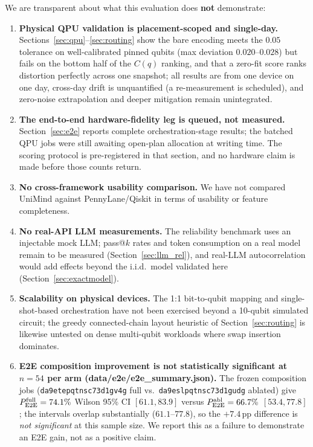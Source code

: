 ﻿\documentclass[12pt,a4paper]{article}
\begin{document}
We are transparent about what this evaluation does \textbf{not} demonstrate:

\begin{enumerate}[leftmargin=2em]
    \item \textbf{Physical QPU validation is placement-scoped and single-day.} Sections~\ref{sec:qpu}--\ref{sec:routing} show the bare encoding meets the $0.05$ tolerance on well-calibrated pinned qubits (max deviation $0.020$--$0.028$) but fails on the bottom half of the $C(q)$ ranking, and that a zero-fit score ranks distortion perfectly across one snapshot; all results are from one device on one day, cross-day drift is unquantified (a re-measurement is scheduled), and zero-noise extrapolation and deeper mitigation remain unintegrated.
    \item \textbf{The end-to-end hardware-fidelity leg is queued, not measured.} Section~\ref{sec:e2e} reports complete orchestration-stage results; the batched QPU jobs were still awaiting open-plan allocation at writing time. The scoring protocol is pre-registered in that section, and no hardware claim is made before those counts return.
    \item \textbf{No cross-framework usability comparison.} We have not compared UniMind against PennyLane/Qiskit in terms of usability or feature completeness.
    \item \textbf{No real-API LLM measurements.} The reliability benchmark uses an injectable mock LLM; pass@$k$ rates and token consumption on a real model remain to be measured (Section~\ref{sec:llm_rel}), and real-LLM autocorrelation would add effects beyond the i.i.d.\ model validated here (Section~\ref{sec:exactmodel}).
    \item \textbf{Scalability on physical devices.} The 1:1 bit-to-qubit mapping and single-shot-based orchestration have not been exercised beyond a 10-qubit simulated circuit; the greedy connected-chain layout heuristic of Section~\ref{sec:routing} is likewise untested on dense multi-qubit workloads where swap insertion dominates.
    \item \textbf{E2E composition improvement is not statistically significant at $n{=}54$ per arm (data/e2e/e2e\_summary.json).} The frozen composition jobs (\texttt{da9etepqtnsc73d1gv4g} full vs.\ \texttt{da9eslpqtnsc73d1gudg} ablated) give $P_{\rm E2E}^{\rm full}=74.1\%$ Wilson 95\% CI $[61.1,83.9]$ versus $P_{\rm E2E}^{\rm abl}=66.7\%$ $[53.4,77.8]$; the intervals overlap substantially ($61.1$--$77.8$), so the $+7.4$\,pp difference is \emph{not significant} at this sample size. We report this as a failure to demonstrate an E2E gain, not as a positive claim.

\end{enumerate}
\end{document}
